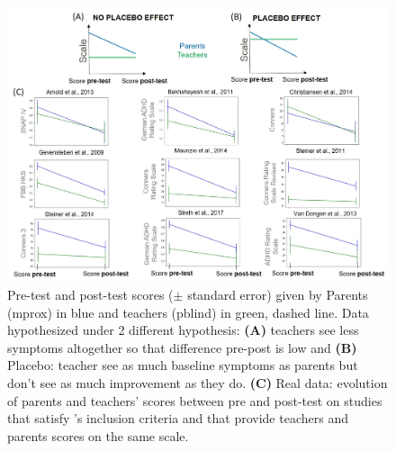 \begin{figure}[h!]
  \centering
  \includegraphics[width=1.0\linewidth]{figures/discussion_on_placebo_effect_colors_2-columns_fitting_image.jpg}
  \caption{Pre-test and post-test scores ($\pm$ standard error) given by Parents (\gls{mprox}) in blue and teachers (\gls{pblind}) in green, dashed line. 
	Data hypothesized under 2 different hypothesis: \textbf{(A)} teachers see less symptoms altogether so that difference pre-post is low and \textbf{(B)}
	Placebo: teacher see as much baseline symptoms as parents but don't see as much improvement as they do. \textbf{(C)} Real data: evolution of parents 
	and teachers' scores between pre and post-test on studies that satisfy \citeauthor{Cortese2016}'s inclusion criteria and that provide teachers and parents
	scores on the same scale.}
  \label{Figure:discussion_on_placebo_effect_colors_2-columns_fitting_image}
\end{figure} 
